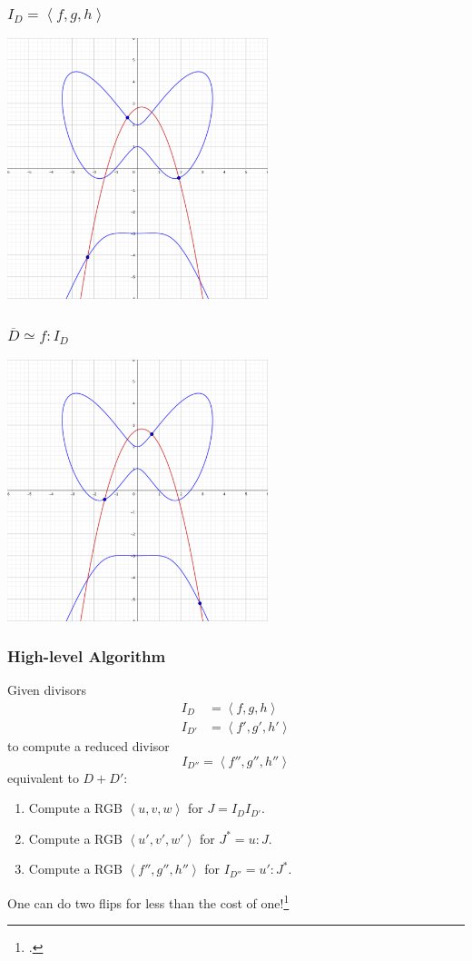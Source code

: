 \documentclass{beamer}
\newcommand{\pid}[1]{\left\langle #1 \right\rangle}
\renewcommand{\bar}{\overline}
\begin{document}
\begin{frame}
\frametitle{$I_D = \pid{f, g, h}$}
  \begin{center} \includegraphics[height=7.6cm]{d1_f.png} \end{center}
\end{frame}
\begin{frame}
\frametitle{$\bar D \simeq f : I_D$}
  \begin{center} \includegraphics[height=7.6cm]{flip_d1.png} \end{center}
\end{frame}


\begin{frame}
\frametitle{High-level Algorithm}
  Given divisors
  \begin{align*}
    I_D &= \pid{f, g, h}\\
    I_{D'} &= \pid{f', g', h'}
  \end{align*}
  to compute a reduced divisor
  \[ I_{D''} = \pid{f'', g'', h''}\]
  equivalent to $D + D'$:
  \begin{enumerate}
    \item Compute a RGB $\pid{u, v, w}$ for $J = I_D I_{D'}$.
    \item Compute a RGB $\pid{u', v', w'}$ for $J^* = u : J$.
    \item Compute a RGB $\pid{f'', g'', h''}$ for $I_{D''} = u' : J^*$.
  \end{enumerate}
  \vspace{10pt}
  One can do two flips for less than the cost of one!\footcite{kamal18}
\end{frame}
\end{document}
